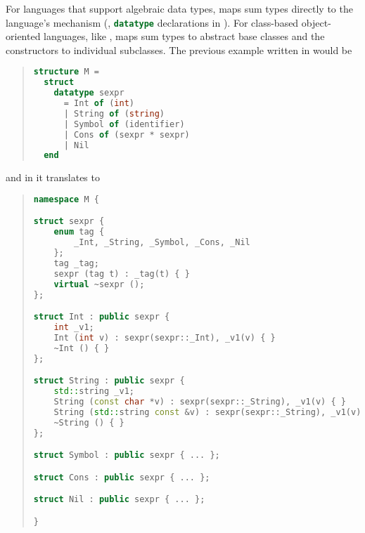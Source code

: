 For languages that support algebraic data types, \asdlgen{} maps sum types directly
to the language's mechanism (\eg{}, \lstinline[language=SML]!datatype! declarations
in \sml{}).
For class-based object-oriented languages, like \Cplusplus{}, \asdlgen{} maps
sum types to abstract base classes and the constructors to individual subclasses.
The previous example written in \sml{} would be
\begin{quote}\begin{lstlisting}[language=SML]
structure M =
  struct
    datatype sexpr
      = Int of (int)
      | String of (string)
      | Symbol of (identifier)
      | Cons of (sexpr * sexpr)
      | Nil
  end
\end{lstlisting}\end{quote}%
and in \Cplusplus{} it translates to
\begin{quote}\begin{lstlisting}[language=c++]
namespace M {

struct sexpr {
    enum tag {
        _Int, _String, _Symbol, _Cons, _Nil
    };
    tag _tag;
    sexpr (tag t) : _tag(t) { }
    virtual ~sexpr ();
};

struct Int : public sexpr {
    int _v1;
    Int (int v) : sexpr(sexpr::_Int), _v1(v) { }
    ~Int () { }
};

struct String : public sexpr {
    std::string _v1;
    String (const char *v) : sexpr(sexpr::_String), _v1(v) { }
    String (std::string const &v) : sexpr(sexpr::_String), _v1(v) { }
    ~String () { }
};

struct Symbol : public sexpr { ... };

struct Cons : public sexpr { ... };

struct Nil : public sexpr { ... };

}
\end{lstlisting}\end{quote}%

